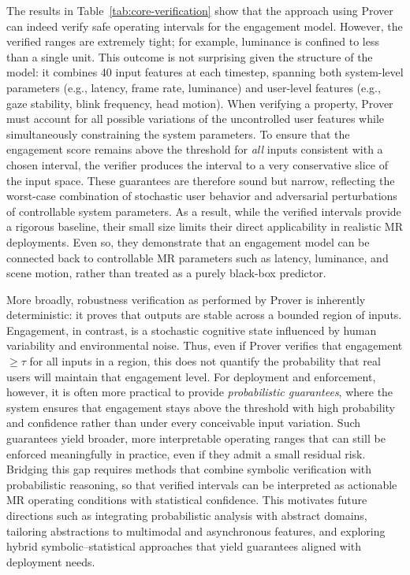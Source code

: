 \documentclass[review]{vgtc}                 %
\begin{document}
The results in Table~\ref{tab:core-verification} show that the approach using Prover can indeed verify safe operating intervals for the engagement model. However, the verified ranges are extremely tight; for example,
luminance is confined to less than a single unit. This outcome is not surprising given the structure of the model: it combines 40 input features at each timestep, spanning both system-level parameters
(e.g., latency, frame rate, luminance) and user-level features (e.g., gaze stability, blink
frequency, head motion). When verifying a property, Prover must account for all possible variations
of the uncontrolled user features while simultaneously constraining the system parameters. To ensure that the engagement score remains above the threshold for \emph{all} inputs consistent with a chosen
interval, the verifier produces the interval to a very conservative slice of the input space. These guarantees are therefore sound but narrow, reflecting the worst-case combination of stochastic user behavior and adversarial perturbations of controllable system parameters. As a result, while the
verified intervals provide a rigorous baseline, their small size limits their direct applicability in realistic MR deployments. Even so, they demonstrate that an engagement model can be connected back to controllable MR parameters such as latency, luminance, and scene motion, rather than treated as a purely black-box predictor.

More broadly, robustness verification as performed by Prover is inherently deterministic: it proves that outputs are stable across a bounded region of inputs. Engagement, in contrast, is a stochastic
cognitive state influenced by human variability and environmental noise. Thus, even if Prover
verifies that engagement $\geq \tau$ for all inputs in a region, this does not quantify the probability that real users will maintain that engagement level. For deployment and enforcement,
however, it is often more practical to provide \emph{probabilistic guarantees}, where the system ensures that engagement stays above the threshold with high probability and confidence rather than
under every conceivable input variation. Such guarantees yield broader, more interpretable operating ranges that can still be enforced meaningfully in practice, even if they admit a small residual risk.
Bridging this gap requires methods that combine symbolic verification with probabilistic reasoning, so that verified intervals can be interpreted as actionable MR operating conditions with statistical confidence. This motivates future directions such as integrating probabilistic analysis with abstract
domains, tailoring abstractions to multimodal and asynchronous features, and exploring hybrid symbolic–statistical approaches that yield guarantees aligned with deployment needs.
\end{document}
